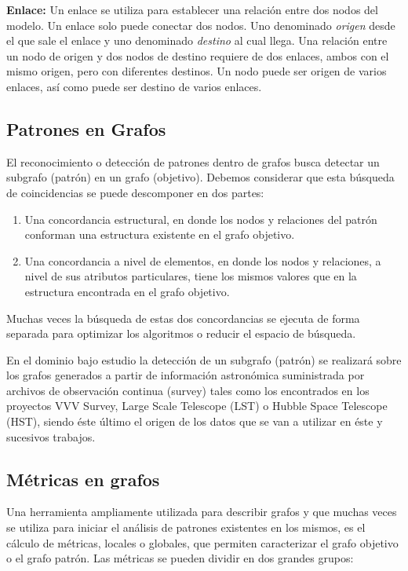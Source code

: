 	\textbf{Enlace:} Un enlace se utiliza para establecer una relación entre dos nodos del modelo. 
	Un enlace solo puede conectar dos nodos. Uno denominado \emph{origen} desde el que sale el enlace y uno denominado \emph{destino} al cual llega. Una relación entre un nodo de origen y dos nodos de destino requiere de dos enlaces, ambos con el mismo origen, pero con diferentes destinos. Un nodo puede ser origen de varios enlaces, así como puede ser destino de varios enlaces\cite{van2010graph,bondy1976graph}.
	
	\subsection{Patrones en Grafos}
	
	El reconocimiento o detección de patrones dentro de grafos busca detectar un subgrafo (patrón) en un grafo (objetivo). Debemos considerar que esta búsqueda de coincidencias se puede descomponer en dos partes:
	
	\begin{enumerate}
		\item Una concordancia estructural, en donde los nodos y relaciones del patrón conforman una estructura existente en el grafo objetivo.
		\item Una concordancia a nivel de elementos, en donde los nodos y relaciones, a nivel de sus atributos particulares, tiene los mismos valores que en la estructura encontrada en el grafo objetivo.
	\end{enumerate}
	
	Muchas veces la búsqueda de estas dos concordancias se ejecuta de forma separada para optimizar los algoritmos o reducir el espacio de búsqueda\cite{fan2012graph}.
	
	En el dominio bajo estudio la detección de un subgrafo (patrón) se realizará sobre los grafos generados a partir de información astronómica suministrada por archivos de observación continua (survey) tales como los encontrados en los proyectos VVV Survey, Large Scale Telescope (LST) o Hubble Space Telescope (HST), siendo éste último el origen de los datos que se van a utilizar en éste y sucesivos trabajos.
	
	\subsection{Métricas en grafos}
	
	Una herramienta ampliamente utilizada para describir grafos y que muchas veces se utiliza para iniciar el análisis de patrones existentes en los mismos, es el cálculo de métricas\cite{van2010graph}, locales o globales, que permiten caracterizar el grafo objetivo o el grafo patrón. Las métricas se pueden dividir en dos grandes grupos:
	
